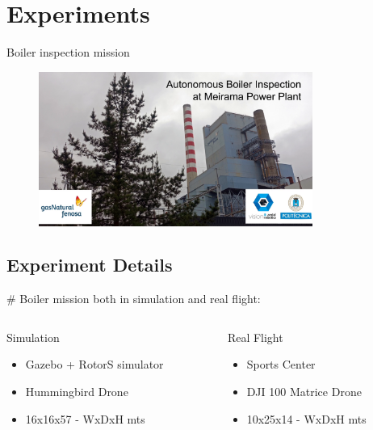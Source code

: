 \documentclass[]{beamer}
\newcommand{\mSlideTitle}{{{\color{gray}\secname}} \# \subsecname}
\begin{document}
\section{Experiments}
\begin{frame}{\secname}
  \alert{Boiler inspection mission}
  \begin{figure}
    \centering
    \includegraphics[width=0.8\textwidth]{BoilerReal.png}
  \end{figure}
\end{frame}

\subsection{Experiment Details}
\begin{frame}{\mSlideTitle}
  Boiler mission both in simulation and real flight:
  \vspace{2.5em}
  \begin{columns}
    \begin{column}{0.5\textwidth}
      Simulation
      \begin{itemize}
        \item Gazebo + RotorS simulator
        \item Hummingbird Drone
        \item 16x16x57 - WxDxH mts
      \end{itemize}
    \end{column}
    \begin{column}{0.5\textwidth}
      Real Flight
      \begin{itemize}
        \item Sports Center
        \item DJI 100 Matrice Drone
        \item 10x25x14 - WxDxH mts
      \end{itemize}
    \end{column}
  \end{columns}
\end{frame}
\end{document}

